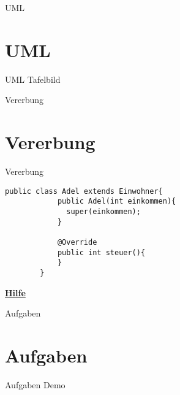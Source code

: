 \documentclass[10pt]{beamer}
\begin{document}
\begin{frame}[fragile]{UML}
    \section{UML}
\end{frame}

\begin{frame}[fragile]{UML}
     Tafelbild
\end{frame}

\begin{frame}[fragile]{Vererbung}
    \section{Vererbung}
\end{frame}

\begin{frame}[fragile]{Vererbung}
    \begin{lstlisting}[basicstyle=\ttfamily\scriptsize,gobble=8]
        public class Adel extends Einwohner{
            public Adel(int einkommen){
	          super(einkommen);
            }

            @Override
            public int steuer(){
            }
        }
    \end{lstlisting}

    \textcolor{mymauve}{\textbf{\href{http://www.codeadventurer.de/?p=3027}{Hilfe}\\}}
\end{frame}

\begin{frame}[fragile]{Aufgaben}
    \section{Aufgaben}
\end{frame}

\begin{frame}[fragile]{Aufgaben}
    Demo
\end{frame}
\end{document}
